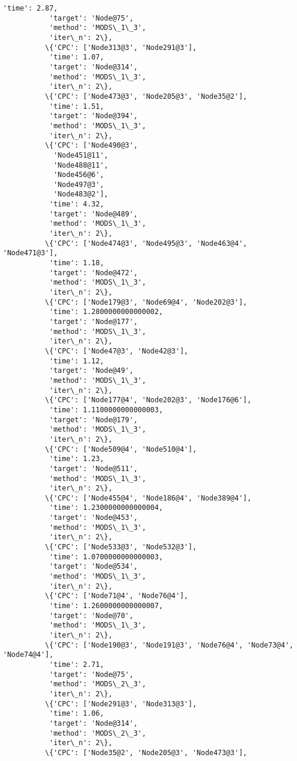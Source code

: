 \documentclass[11pt]{article}
\begin{document}
\begin{Verbatim}[commandchars=\\\{\}]
           'time': 2.87,
           'target': 'Node@75',
           'method': 'MODS\_1\_3',
           'iter\_n': 2\},
          \{'CPC': ['Node313@3', 'Node291@3'],
           'time': 1.07,
           'target': 'Node@314',
           'method': 'MODS\_1\_3',
           'iter\_n': 2\},
          \{'CPC': ['Node473@3', 'Node205@3', 'Node35@2'],
           'time': 1.51,
           'target': 'Node@394',
           'method': 'MODS\_1\_3',
           'iter\_n': 2\},
          \{'CPC': ['Node490@3',
            'Node451@11',
            'Node488@11',
            'Node456@6',
            'Node497@3',
            'Node483@2'],
           'time': 4.32,
           'target': 'Node@489',
           'method': 'MODS\_1\_3',
           'iter\_n': 2\},
          \{'CPC': ['Node474@3', 'Node495@3', 'Node463@4', 'Node471@3'],
           'time': 1.18,
           'target': 'Node@472',
           'method': 'MODS\_1\_3',
           'iter\_n': 2\},
          \{'CPC': ['Node179@3', 'Node69@4', 'Node202@3'],
           'time': 1.2800000000000002,
           'target': 'Node@177',
           'method': 'MODS\_1\_3',
           'iter\_n': 2\},
          \{'CPC': ['Node47@3', 'Node42@3'],
           'time': 1.12,
           'target': 'Node@49',
           'method': 'MODS\_1\_3',
           'iter\_n': 2\},
          \{'CPC': ['Node177@4', 'Node202@3', 'Node176@6'],
           'time': 1.1100000000000003,
           'target': 'Node@179',
           'method': 'MODS\_1\_3',
           'iter\_n': 2\},
          \{'CPC': ['Node509@4', 'Node510@4'],
           'time': 1.23,
           'target': 'Node@511',
           'method': 'MODS\_1\_3',
           'iter\_n': 2\},
          \{'CPC': ['Node455@4', 'Node186@4', 'Node389@4'],
           'time': 1.2300000000000004,
           'target': 'Node@453',
           'method': 'MODS\_1\_3',
           'iter\_n': 2\},
          \{'CPC': ['Node533@3', 'Node532@3'],
           'time': 1.0700000000000003,
           'target': 'Node@534',
           'method': 'MODS\_1\_3',
           'iter\_n': 2\},
          \{'CPC': ['Node71@4', 'Node76@4'],
           'time': 1.2600000000000007,
           'target': 'Node@70',
           'method': 'MODS\_1\_3',
           'iter\_n': 2\},
          \{'CPC': ['Node190@3', 'Node191@3', 'Node76@4', 'Node73@4', 'Node74@4'],
           'time': 2.71,
           'target': 'Node@75',
           'method': 'MODS\_2\_3',
           'iter\_n': 2\},
          \{'CPC': ['Node291@3', 'Node313@3'],
           'time': 1.06,
           'target': 'Node@314',
           'method': 'MODS\_2\_3',
           'iter\_n': 2\},
          \{'CPC': ['Node35@2', 'Node205@3', 'Node473@3'],

\end{Verbatim}
\end{document}
